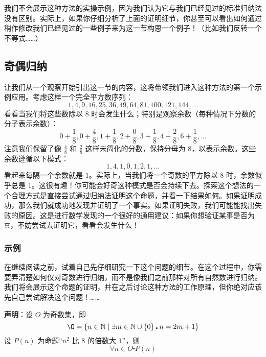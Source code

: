 我们不会展示这种方法的实操示例，因为我们认为它与我们已经见过的标准归纳法没有区别。实际上，如果你仔细分析了上面的证明细节，你甚至可以看出如何通过稍作修改我们已经见过的一些例子来为这一节构思一个例子！（比如我们反转一个不等式……）

\subsection{奇偶归纳}

让我们从一个观察开始引出这一节的内容，这将带领我们进入这种方法的第一个示例应用。考虑这样一个完全平方数序列：
\[1, 4, 9, 16, 25, 36, 49, 64, 81, 100, 121, 144, \dots\]
看看当我们将这些数除以 $8$ 时会发生什么；特别是观察余数（每种情况下分数的分子表示余数）：
\[0+\frac{1}{8}, 0+\frac{4}{8}, 1+\frac{1}{8}, 2+\frac{0}{8}, 3+\frac{1}{8}, 4+\frac{2}{8}, 6+\frac{1}{8},  \dots\]
注意我们保留了像 $\frac{4}{8}$ 和 $\frac{2}{8}$ 这样未简化的分数，保持分母为 $8$，以表示余数。这些余数遵循以下模式：
\[1, 4, 1, 0, 1, 2, 1, \dots\]
看起来每隔一个余数就是 $1$。实际上，当我们将一个奇数的平方除以 $8$ 时，余数似乎总是 $1$。这很有趣！你可能会好奇这种模式是否会持续下去。探索这个想法的一个合理方式是直接尝试通过归纳法证明这个命题，并看一下结果如何。如果证明成功，那么我们就成功地发现并证明了一个事实。如果证明失败，我们可能能找出失败的原因。这是进行数学发现的一个很好的通用建议：如果你想验证某事是否为\verb|真|，不妨尝试去证明它，看看会发生什么！

\subsubsection*{示例}

在继续阅读之前，试着自己先仔细研究一下这个问题的细节。在这个过程中，你需要弄清楚如何仅对奇数进行归纳，而不是像我们之前那样对所有自然数进行归纳。我们将会展示这个命题的证明，并在之后讨论这种方法的工作原理，但你绝对应该先自己尝试解决这个问题！…… \\

\begin{example}

   \textbf{声明}：设 $O$ 为奇数集，即
   \[\O = \{n \in \mathbb{N} \mid \exists m \in \mathbb{N} \cup \{0\} \centerdot n = 2m+1\}\]
   设 $P(n)$ 为命题``$n^2$ 比 $8$ 的倍数大 $1$''，则
   \[\forall n \in O \centerdot P(n)\]
\end{example}

